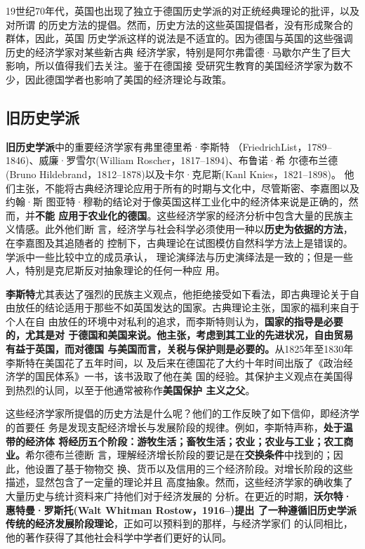19世纪70年代，英国也出现了独立于德国历史学派的对正统经典理论的批评，以及对所谓
的历史方法的提倡。然而，历史方法的这些英国提倡者，没有形成聚合的群体，因此，英国
历史学派这样的说法是不适宜的。因为德国与英国的这些强调历史的经济学家对某些新古典
经济学家，特别是阿尔弗雷德·马歇尔产生了巨大影响，所以值得我们去关注。鉴于在德国接
受研究生教育的美国经济学家为数不少，因此德国学者也影响了美国的经济理论与政策。

\subsection{旧历史学派}

\textbf{旧历史学派}中的重要经济学家有弗里德里希·李斯特
（FriedrichList，1789--1846)、威廉·罗雪尔(William Roscher，1817--1894)、布鲁诺·希
尔德布兰德(Bruno Hildebrand，1812--1878)以及卡尔·克尼斯(Kanl Knies，1821--1898)。
他们主张，不能将古典经济理论应用于所有的时期与文化中，尽管斯密、李嘉图以及约翰·斯
图亚特·穆勒的结论对于像英国这样工业化中的经济体来说是正确的，然而，并\textbf{不能
  应用于农业化的德国}。这些经济学家的经济分析中包含大量的民族主义情感。此外他们断
言，经济学与社会科学必须使用一种以\textbf{历史为依据的方法}，在李嘉图及其追随者的
控制下，古典理论在试图模仿自然科学方法上是错误的。学派中一些比较中立的成员承认，
理论演绎法与历史演绎法是一致的；但是一些人，特别是克尼斯反对抽象理论的任何一种应
用。

\textbf{李斯特}尤其表达了强烈的民族主义观点，他拒绝接受如下看法，即古典理论关于自
由放任的结论适用于那些不如英国发达的国家。古典理论主张，国家的福利来自于个人在自
由放任的环境中对私利的追求，而李斯特则认为，\textbf{国家的指导是必要的，尤其是对
  于德国和美国来说。他主张，考虑到其工业的先进状况，自由贸易有益于英国，而对德国
  与美国而言，关税与保护则是必要的。}从1825年至1830年李斯特在美国花了五年时间，以
及后来在德国花了大约十年时间出版了《政治经济学的国民体系》一书，该书汲取了他在美
国的经验。其保护主义观点在美国得到热烈的认同，以至于他通常被称作\textbf{美国保护
  主义之父}。

这些经济学家所提倡的历史方法是什么呢？他们的工作反映了如下信仰，即经济学的首要任
务是发现支配经济增长与发展阶段的规律。例如，李斯特声称，\textbf{处于温带的经济体
  将经历五个阶段：游牧生活；畜牧生活；农业；农业与工业；农工商业。}希尔德布兰德断
言，理解经济增长阶段的要记是在\textbf{交换条件}中找到的；因此，他设置了基于物物交
换、货币以及信用的三个经济阶段。对增长阶段的这些描述，显然包含了一定量的理论并且
高度抽象。然而，这些经济学家的确收集了大量历史与统计资料来广持他们对于经济发展的
分析。在更近的时期，\textbf{沃尔特·惠特曼·罗斯托(Walt Whitman Rostow，1916--)提出
  了一种遵循旧历史学派传统的经济发展阶段理论}，正如可以预料到的那样，与经济学家们
的认同相比，他的著作获得了其他社会科学中学者们更好的认同。


